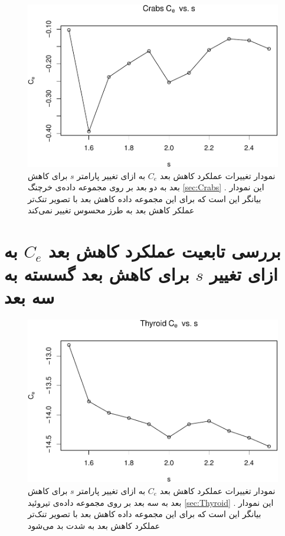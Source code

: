 \begin{figure}[H]
\centering
\includegraphics[width=0.7\linewidth]{Report_files/figure-latex/unnamed-chunk-24-7}
\caption{
نمودار تغییرات عملکرد کاهش بعد 
$C_e$
به ازای تغییر پارامتر
$s$
برای کاهش بعد به 
دو
 بعد بر روی مجموعه داده‌‌‌ی 
خرچنگ
\ref{sec:Crabs}
. این نمودار بیانگر این است که برای این مجموعه داده کاهش بعد 
با تصویر تنک‌تر عملکر کاهش بعد به طرز محسوس تغییر نمی‌کند
}
\end{figure}


\section{
بررسی تابعیت عملکرد کاهش بعد $C_e$ به ازای تغییر $s$ برای کاهش بعد گسسته به سه بعد
}


\begin{figure}[H]
\centering
\includegraphics[width=0.7\linewidth]{Report_files/figure-latex/unnamed-chunk-26-1}
\caption{
نمودار تغییرات عملکرد کاهش بعد 
$C_e$
به ازای تغییر پارامتر
$s$
برای کاهش بعد به 
سه بعد بر روی مجموعه داده‌‌‌ی 
تیروئید
\ref{sec:Thyroid}
. این نمودار بیانگر این است که برای این مجموعه داده کاهش بعد 
با تصویر تنک‌تر عملکرد کاهش بعد به شدت بد می‌شود
}
\end{figure}

